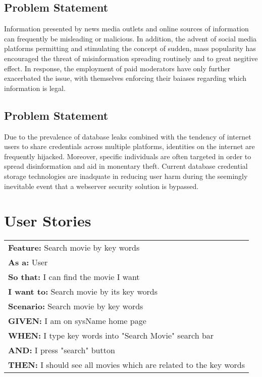\documentclass{article}
\begin{document}
\subsection{Problem Statement}
Information presented by news media outlets and online sources of information
can frequently be misleading or malicious. In addition, the advent of social
media platforms permitting and stimulating the concept of sudden, mass 
popularity has encouraged the threat of misinformation spreading routinely and
to great negitive effect. In response, the employment of paid moderators have
only further exacerbated the issue, with themselves enforcing their baiases
regarding which information is legal.
\subsection{Problem Statement}
Due to the prevalence of database leaks combined with the tendency of internet
users to share credentials across multiple platforms, identities on the internet
are frequently hijacked. Moreover, specific individuals are often targeted in
order to spread disinformation and aid in monentary theft. Current database
credential storage technologies are inadquate in reducing user harm during the
seemingly inevitable event that a webserver security solution is bypassed.

\section{User Stories}
\begin{table}[]
\begin{tabular}{|l|}
\hline
\textbf{Feature:} Search movie by key words   \\
\textbf{As a:} User\\
\textbf{So that:} I can find the movie I want\\
\textbf{I want to:} Search movie by its key words\\
\textbf{Scenario:} Search movie by key words\\
\textbf{GIVEN:} I am on sysName home page\\
\textbf{WHEN:} I type key words into "Search Movie" search bar\\
\textbf{AND:} I press "search" button\\
\textbf{THEN:} I should see all movies which are related to the key words\\
\hline
\end{tabular}
\end{table}
\end{document}
